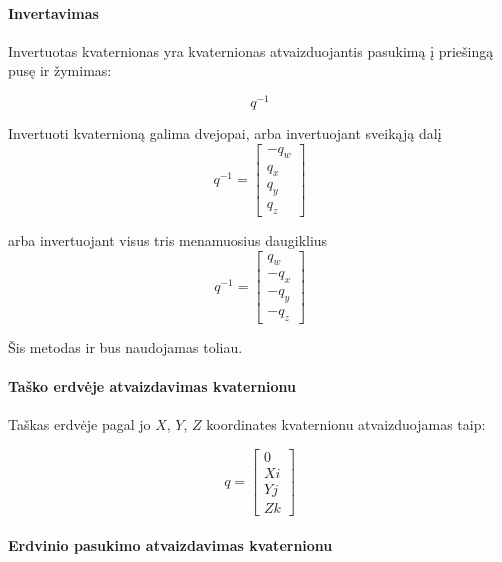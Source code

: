 \documentclass[12pt, a4paper, lithuanian, final]{article}
\begin{document}
\paragraph{Invertavimas}

Invertuotas kvaternionas yra kvaternionas atvaizduojantis pasukimą į priešingą pusę ir žymimas:

\begin{equation}
	q^{-1}
\end{equation}

Invertuoti kvaternioną galima dvejopai, arba invertuojant sveikąją dalį
\begin{equation}
	q^{-1} = \left[
		\begin{array}{c}
			-q_{w} \\
			q_{x} \\
			q_{y} \\
			q_{z}
		\end{array}
	\right]
\end{equation}

arba invertuojant visus tris menamuosius daugiklius
\begin{equation}
	q^{-1} = \left[
		\begin{array}{c}
			q_{w} \\
			-q_{x} \\
			-q_{y} \\
			-q_{z}
		\end{array}
	\right]
\end{equation}

Šis metodas ir bus naudojamas toliau.


\paragraph{Taško erdvėje atvaizdavimas kvaternionu}

Taškas erdvėje pagal jo $X$, $Y$, $Z$ koordinates kvaternionu atvaizduojamas taip:

\begin{equation}
	q = \left[
		\begin{array}{c}
			0\\
			Xi\\
			Yj\\
			Zk
		\end{array}
	\right]
\end{equation}


\paragraph{Erdvinio pasukimo atvaizdavimas kvaternionu}
\end{document}
